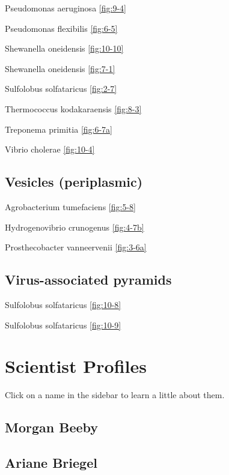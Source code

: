 \documentclass[]{tufte-book}
\begin{document}
Pseudomonas aeruginosa \ref{fig:9-4}

Pseudomonas flexibilis \ref{fig:6-5}

Shewanella oneidensis \ref{fig:10-10}

Shewanella oneidensis \ref{fig:7-1}

Sulfolobus solfataricus \ref{fig:2-7}

Thermococcus kodakaraensis \ref{fig:8-3}

Treponema primitia \ref{fig:6-7a}

Vibrio cholerae \ref{fig:10-4}

\hypertarget{vesicles-periplasmic}{%
\section*{Vesicles (periplasmic)}\label{vesicles-periplasmic}}

Agrobacterium tumefaciens \ref{fig:5-8}

Hydrogenovibrio crunogenus \ref{fig:4-7b}

Prosthecobacter vanneervenii \ref{fig:3-6a}

\hypertarget{virus-associated-pyramids}{%
\section*{Virus-associated pyramids}\label{virus-associated-pyramids}}

Sulfolobus solfataricus \ref{fig:10-8}

Sulfolobus solfataricus \ref{fig:10-9}

\hypertarget{scientist-profiles}{%
\chapter{Scientist Profiles}\label{scientist-profiles}}

Click on a name in the sidebar to learn a little about them.

\hypertarget{morgan_beeby}{%
\section*{Morgan Beeby}\label{morgan_beeby}}

\hypertarget{ariane_briegel}{%
\section*{Ariane Briegel}\label{ariane_briegel}}
\end{document}
